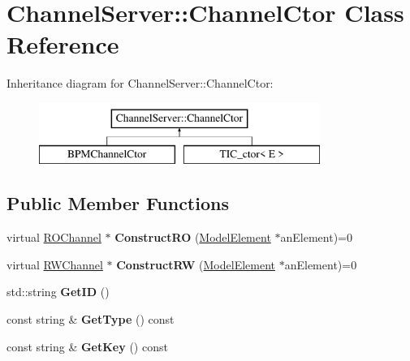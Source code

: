 \hypertarget{classChannelServer_1_1ChannelCtor}{}\section{Channel\+Server\+:\+:Channel\+Ctor Class Reference}
\label{classChannelServer_1_1ChannelCtor}
Inheritance diagram for Channel\+Server\+:\+:Channel\+Ctor\+:\begin{figure}[H]
\begin{center}
\leavevmode
\includegraphics[height=2.000000cm]{classChannelServer_1_1ChannelCtor}
\end{center}
\end{figure}
\subsection*{Public Member Functions}
\begin{DoxyCompactItemize}
\item 
\mbox{\label{classChannelServer_1_1ChannelCtor_a682cb384c9d734a4f5d5299b26df312e}} 
virtual \hyperlink{classROChannel}{R\+O\+Channel} $\ast$ {\bfseries Construct\+RO} (\hyperlink{classModelElement}{Model\+Element} $\ast$an\+Element)=0
\item 
\mbox{\label{classChannelServer_1_1ChannelCtor_af75ca12bf26102eacb1e8a729ff3690b}} 
virtual \hyperlink{classRWChannel}{R\+W\+Channel} $\ast$ {\bfseries Construct\+RW} (\hyperlink{classModelElement}{Model\+Element} $\ast$an\+Element)=0
\item 
\mbox{\label{classChannelServer_1_1ChannelCtor_ad1ef45766e2c8d83033db9c3170d0a1b}} 
std\+::string {\bfseries Get\+ID} ()
\item 
\mbox{\label{classChannelServer_1_1ChannelCtor_af2e88064ee9b1d1a02e31b59aaf8700b}} 
const string \& {\bfseries Get\+Type} () const
\item 
\mbox{\label{classChannelServer_1_1ChannelCtor_a6aacf865e0d9b04e70da858458662656}} 
const string \& {\bfseries Get\+Key} () const
\end{DoxyCompactItemize}
